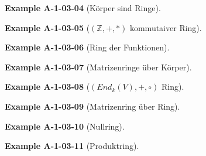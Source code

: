\documentclass[10pt, letterpaper]{article}
\newcommand{\Z}{\mathbb{Z}}
\newcommand{\CustomHeading}[3]{%
  \par\medskip\noindent%
  \textbf{#1 #2} \textnormal{(#3)}.\enskip%
}
\newenvironment{EXA}[2]{\CustomHeading{Example}{#1}{#2}}{}
\begin{document}

\begin{EXA}{A-1-03-04}{Körper sind Ringe}
\end{EXA}


\begin{EXA}{A-1-03-05}{$(\Z,+,*)$ kommutaiver Ring}
\end{EXA}


\begin{EXA}{A-1-03-06}{Ring der Funktionen}
\end{EXA}


\begin{EXA}{A-1-03-07}{Matrizenringe über Körper}
\end{EXA}


\begin{EXA}{A-1-03-08}{$(End_k(V),+,\circ)$ Ring}
\end{EXA}


\begin{EXA}{A-1-03-09}{Matrizenring über Ring}
\end{EXA}


\begin{EXA}{A-1-03-10}{Nullring}
\end{EXA}


\begin{EXA}{A-1-03-11}{Produktring}
\end{EXA}
\end{document}

